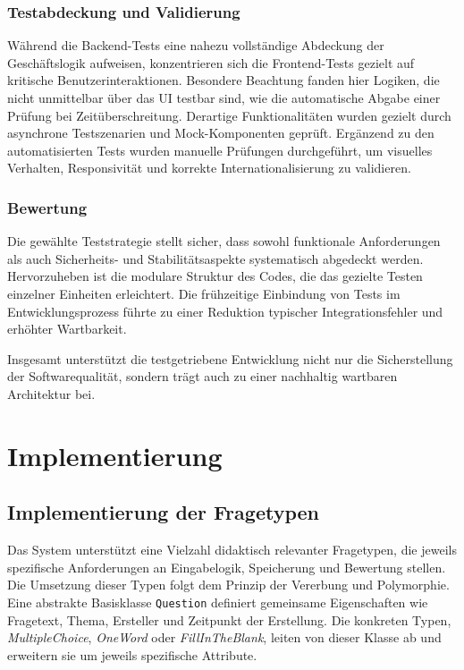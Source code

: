 \documentclass[a4paper,12pt]{article}
\begin{document}
\subsubsection{Testabdeckung und Validierung}
Während die Backend-Tests eine nahezu vollständige Abdeckung der Geschäftslogik aufweisen, konzentrieren sich die Frontend-Tests gezielt auf kritische Benutzerinteraktionen. Besondere Beachtung fanden hier Logiken, die nicht unmittelbar über das UI testbar sind, wie die automatische Abgabe einer Prüfung bei Zeitüberschreitung. Derartige Funktionalitäten wurden gezielt durch asynchrone Testszenarien und Mock-Komponenten geprüft. Ergänzend zu den automatisierten Tests wurden manuelle Prüfungen durchgeführt, um visuelles Verhalten, Responsivität und korrekte Internationalisierung zu validieren.

\subsubsection{Bewertung}
Die gewählte Teststrategie stellt sicher, dass sowohl funktionale Anforderungen als auch Sicherheits- und Stabilitätsaspekte systematisch abgedeckt werden. Hervorzuheben ist die modulare Struktur des Codes, die das gezielte Testen einzelner Einheiten erleichtert. Die frühzeitige Einbindung von Tests im Entwicklungsprozess führte zu einer Reduktion typischer Integrationsfehler und erhöhter Wartbarkeit.

Insgesamt unterstützt die testgetriebene Entwicklung nicht nur die Sicherstellung der Softwarequalität, sondern trägt auch zu einer nachhaltig wartbaren Architektur bei.

\newpage

\section{Implementierung}
\subsection{Implementierung der Fragetypen}
Das System unterstützt eine Vielzahl didaktisch relevanter Fragetypen, die jeweils spezifische Anforderungen an Eingabelogik, Speicherung und Bewertung stellen. Die Umsetzung dieser Typen folgt dem Prinzip der Vererbung und Polymorphie. Eine abstrakte Basisklasse \texttt{Question} definiert gemeinsame Eigenschaften wie Fragetext, Thema, Ersteller und Zeitpunkt der Erstellung. Die konkreten Typen, \textit{MultipleChoice}, \textit{OneWord} oder \textit{FillInTheBlank}, leiten von dieser Klasse ab und erweitern sie um jeweils spezifische Attribute.
\end{document}

